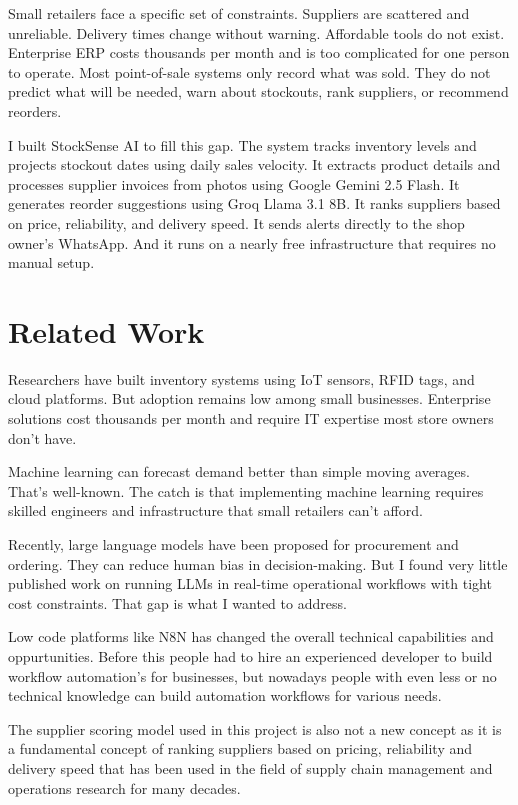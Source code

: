 \documentclass[journal]{IEEEtran}
\begin{document}
Small retailers face a specific set of constraints. Suppliers are scattered and unreliable. Delivery times change without warning. Affordable tools do not exist. Enterprise ERP costs thousands per month and is too complicated for one person to operate. Most point-of-sale systems only record what was sold. They do not predict what will be needed, warn about stockouts, rank suppliers, or recommend reorders.

I built StockSense AI to fill this gap. The system tracks inventory levels and projects stockout dates using daily sales velocity. It extracts product details and processes supplier invoices from photos using Google Gemini 2.5 Flash. It generates reorder suggestions using Groq Llama 3.1 8B. It ranks suppliers based on price, reliability, and delivery speed. It sends alerts directly to the shop owner's WhatsApp. And it runs on a nearly free infrastructure that requires no manual setup.

\section{Related Work}

Researchers have built inventory systems using IoT sensors, RFID tags, and cloud platforms. But adoption remains low among small businesses. Enterprise solutions cost thousands per month and require IT expertise most store owners don't have.

Machine learning can forecast demand better than simple moving averages. That's well-known. The catch is that implementing machine learning requires skilled engineers and infrastructure that small retailers can't afford.

Recently, large language models have been proposed for procurement and ordering. They can reduce human bias in decision-making. But I found very little published work on running LLMs in real-time operational workflows with tight cost constraints. That gap is what I wanted to address.

Low code platforms like N8N has changed the overall technical capabilities and oppurtunities. Before this people had to hire an experienced developer to build workflow automation's for businesses, but nowadays people with even less or no technical knowledge can build automation workflows for various needs.

The supplier scoring model used in this project is also not a new concept as it is a fundamental concept of ranking suppliers based on pricing, reliability and delivery speed that has been used in the field of supply chain management and operations research for many decades.
\end{document}

